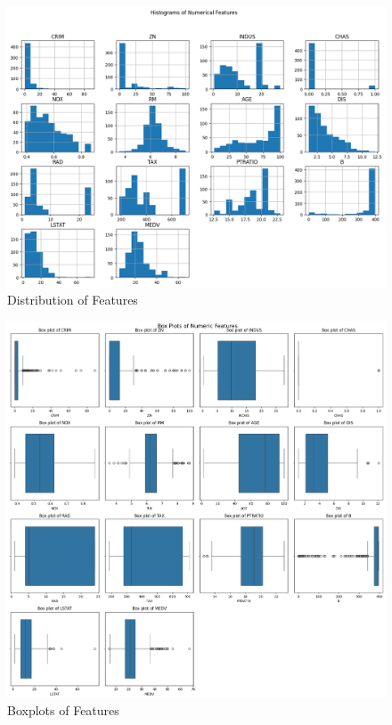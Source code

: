 \documentclass[conference, 11pt]{IEEEtran}
\begin{document}
\begin{figure}
    \centering
    \includegraphics[width=1\linewidth]{histograms.png}
    \caption{Distribution of Features}
    \label{fig:histograms}
\end{figure}

\begin{figure}
    \centering
    \includegraphics[width=1\linewidth]{boxplots.png}
    \caption{Boxplots of Features}
    \label{fig:boxplots}
\end{figure}
\end{document}
